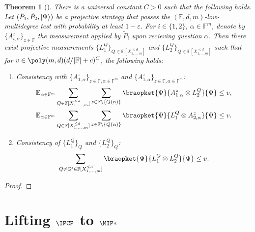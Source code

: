\documentclass[english,12pt]{reedthesis}
\theoremstyle{plain}
\newtheorem{thm}{Theorem}[section]
\theoremstyle{definition}
\theoremstyle{remark}
\DeclarePairedDelimiter{\abs}{\lvert}{\rvert}
\DeclarePairedDelimiter\ket{\lvert}{\rangle}
\begin{document}
\begin{thm}[{\cite{JNVWY20}}]\label{thm:quantum-low-degree}
  There is a universal constant $C > 0$ such that the following holds. Let
  $(\tilde{P}_{1}, \tilde{P}_{2}, \ket{\Psi})$ be a projective strategy that passes
  the $(\mathbb{F}, d, m)$-low-multidegree test with probability at least
  $1 - \varepsilon$. For $i \in \{1, 2\}$, $\alpha \in \mathbb{F}^{m}$, denote by
  $\{A_{i,\alpha}^{z}\}_{z \in \mathbb{F}}$ the measurement applied by $\tilde{P}_{i}$
  upon recieving question $\alpha$. Then there exist projective measurements
  $\{L_{1}^{Q}\}_{Q \in \mathbb{F}[X_{1, \ldots, m}^{\le d}]}$ and
  $\{L_{2}^{Q}\}_{Q \in \mathbb{F}[X_{1, \ldots, m}^{\le d}]}$ such that for
  $v \in \poly(m, d)(d/\abs{\mathbb{F}} + c)^{C}$, the following holds:
  \begin{enumerate}
    \item Consistency with
          $\{A_{1, \alpha}^{z}\}_{z \in \mathbb{F}, \alpha \in \mathbb{F}^{m}}$ and
          $\{A_{1, \alpha}^{z}\}_{z \in \mathbb{F}, \alpha \in \mathbb{F}^{m}}$:
          \begin{align}
            \mathbb{E}_{\alpha \in \mathbb{F}^{m}}\sum_{Q \in \mathbb{F}[X_{1, \ldots, m}^{\le d}]}\sum_{z \in \mathbb{F} \setminus \{Q(\alpha)\}}
            \braopket{\Psi}{A_{1,\alpha}^{z} \otimes L_{2}^{Q}}{\Psi} &\le v, \\
            \mathbb{E}_{\alpha \in \mathbb{F}^{m}}\sum_{Q \in \mathbb{F}[X_{1, \ldots, m}^{\le d}]}\sum_{z \in \mathbb{F} \setminus \{Q(\alpha)\}}
            \braopket{\Psi}{L_{1}^{Q} \otimes A_{2,\alpha}^{z}}{\Psi} &\le v.
          \end{align}
    \item Consistency of $\{L_{1}^{Q}\}_{Q}$ and $\{L_{2}^{Q}\}_{Q}$:
          \begin{equation}
            \sum_{Q \ne Q' \in \mathbb{F}[X_{1, \ldots, m}^{\le d}]}\braopket{\Psi}{L_{1}^{Q} \otimes L_{2}^{Q}}{\Psi} \le v.
          \end{equation}
  \end{enumerate}
\end{thm}

\begin{proof}
\end{proof}

\chapter{Lifting $\IPCP$ to $\MIP*$}\label{chap:ipcp-to-mip}
\end{document}

